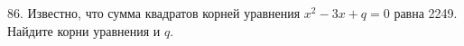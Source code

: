 86. Известно, что сумма квадратов корней уравнения $x^2 -3x + q = 0$ равна 2249.
Найдите корни уравнения и $q.$\\
